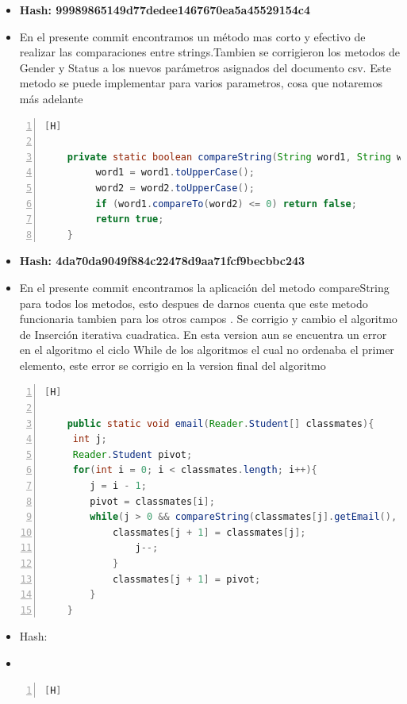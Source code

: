   \begin{itemize}
    \item \textbf{Hash: 99989865149d77dedee1467670ea5a45529154c4}
    \item En el presente commit encontramos un método mas corto y efectivo de realizar las comparaciones entre strings.Tambien se corrigieron los metodos de Gender y Status a los nuevos parámetros asignados del documento csv. Este metodo se puede implementar para varios parametros, cosa que notaremos más adelante
  \end{itemize}
  \begin{lstlisting}[language=Java, caption={Commit: Algunas correcciones}, numbers=left, firstnumber=1][H]
    
	private static boolean compareString(String word1, String word2){
   		 word1 = word1.toUpperCase();
   		 word2 = word2.toUpperCase();
   		 if (word1.compareTo(word2) <= 0) return false;
   		 return true;
  	}
  \end{lstlisting}

  \begin{itemize}
    \item \textbf{Hash: 4da70da9049f884c22478d9aa71fcf9becbbc243}
    \item En el presente commit encontramos la aplicación del metodo compareString para todos los metodos, esto despues de darnos cuenta que este metodo funcionaria tambien para los otros campos . Se corrigio y cambio el algoritmo de Inserción iterativa cuadratica. En esta version aun se encuentra un error en el algoritmo el ciclo While de los algoritmos el cual no ordenaba el primer elemento, este error se corrigio en la version final del algoritmo
  \end{itemize}
  \begin{lstlisting}[language=Java, caption={Commit:  Nos aventuramos en una exploración cognitiva en la implementación del algoritmo Inserción, sin embargo regresamos al camino correcto donde se logra apreciar mejor su eficiencia y funcionalidad}, numbers=left, firstnumber=1][H]
  
    public static void email(Reader.Student[] classmates){
   	 int j;
   	 Reader.Student pivot;
   	 for(int i = 0; i < classmates.length; i++){
   		j = i - 1;
   		pivot = classmates[i];
   		while(j > 0 && compareString(classmates[j].getEmail(), pivot.getEmail())){
   			classmates[j + 1] = classmates[j];
        		j--;
      		}
      		classmates[j + 1] = pivot;
    	}
    }
  \end{lstlisting}
  \begin{itemize}
    \item Hash:
    \item
  \end{itemize}
  \begin{lstlisting}[language=Java, caption={TITULOOOOOO}, numbers=left, firstnumber=1][H]
  \end{lstlisting}
